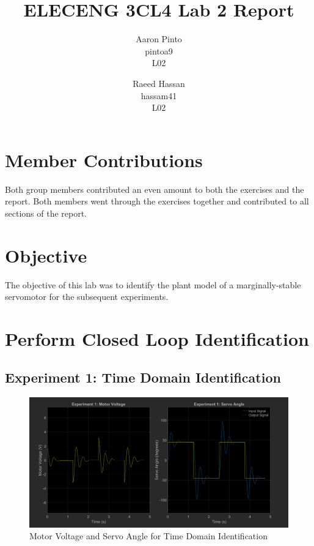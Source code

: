 \documentclass[12pt]{article}
\title{ELECENG 3CL4 Lab 2 Report}
\author{
    Aaron Pinto \\
    pintoa9 \\
    L02
    \and
    Raeed Hassan \\
    hassam41 \\
    L02
}
\begin{document}
\maketitle
\clearpage

\setcounter{section}{2}
\section*{Member Contributions}
Both group members contributed an even amount to both the exercises and the report. Both members went through the exercises together and contributed to all sections of the report.

\section*{Objective} %
The objective of this lab was to identify the plant model of a marginally-stable servomotor for the subsequent experiments.

\section{Perform Closed Loop Identification}
\subsection{Experiment 1: Time Domain Identification}
\begin{figure}[h!]
    \centering
    \includegraphics[width=\textwidth]{exp1}
    \caption{\label{fig:exp1}Motor Voltage and Servo Angle for Time Domain Identification}
\end{figure}
\end{document}
